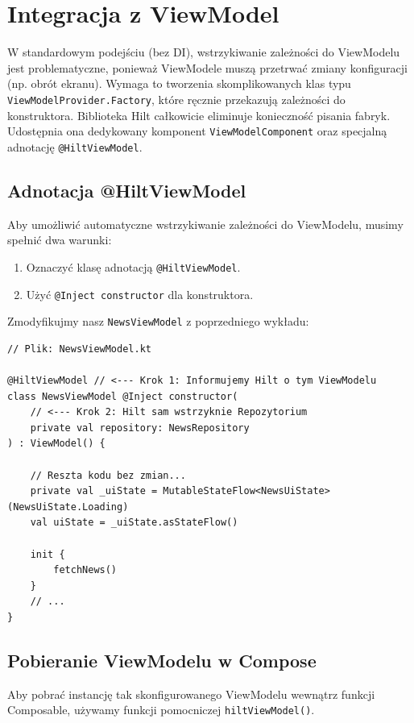 \section{Integracja z ViewModel}

W standardowym podejściu (bez DI), wstrzykiwanie zależności do ViewModelu jest problematyczne, ponieważ ViewModele muszą przetrwać zmiany konfiguracji (np. obrót ekranu). Wymaga to tworzenia skomplikowanych klas typu \texttt{ViewModelProvider.Factory}, które ręcznie przekazują zależności do konstruktora. Biblioteka Hilt całkowicie eliminuje konieczność pisania fabryk. Udostępnia ona dedykowany komponent \texttt{ViewModelComponent} oraz specjalną adnotację \texttt{@HiltViewModel}.

\subsection{Adnotacja @HiltViewModel}

Aby umożliwić automatyczne wstrzykiwanie zależności do ViewModelu, musimy spełnić dwa warunki:
\begin{enumerate}
    \item Oznaczyć klasę adnotacją \texttt{@HiltViewModel}.
    \item Użyć \texttt{@Inject constructor} dla konstruktora.
\end{enumerate}

Zmodyfikujmy nasz \texttt{NewsViewModel} z poprzedniego wykładu:

\begin{verbatim}
// Plik: NewsViewModel.kt

@HiltViewModel // <--- Krok 1: Informujemy Hilt o tym ViewModelu
class NewsViewModel @Inject constructor(
    // <--- Krok 2: Hilt sam wstrzyknie Repozytorium
    private val repository: NewsRepository 
) : ViewModel() {

    // Reszta kodu bez zmian...
    private val _uiState = MutableStateFlow<NewsUiState>(NewsUiState.Loading)
    val uiState = _uiState.asStateFlow()
    
    init {
        fetchNews()
    }
    // ...
}
\end{verbatim}

\subsection{Pobieranie ViewModelu w Compose}

Aby pobrać instancję tak skonfigurowanego ViewModelu wewnątrz funkcji Composable, używamy funkcji pomocniczej \texttt{hiltViewModel()}.

